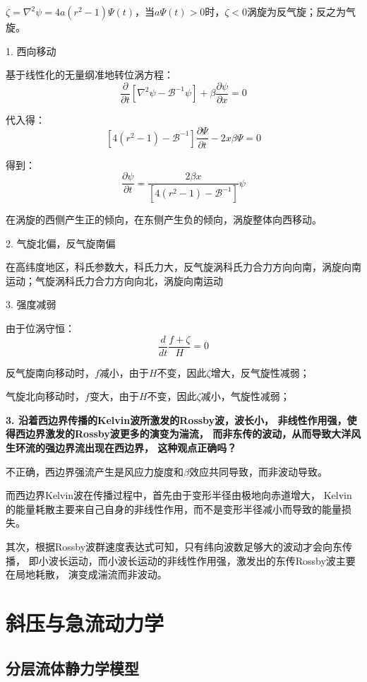 \documentclass{article}
\begin{document}
$\zeta={{\nabla }}^{2}{{\psi }} = 4a(r^2-1)\Psi(t)$，当$a\Psi(t)>0$时，$\zeta<0$涡旋为反气旋；反之为气旋。

1. 西向移动

基于线性化的无量纲准地转位涡方程：
$$\frac{\partial }{\partial {{t}}}\left[ {{\nabla }}^{2}{{\psi }}-{\mathcal{B}^{-1}}{{\psi }} \right]+{{\beta }}\frac{\partial {{\psi }}}{\partial {{x}}}=0$$

代入得：
$$\left[ 4({{r}^{2}}-1)-{{\mathcal{B}}^{-1}} \right]\frac{\partial \Psi }{\partial t}-2x\beta \Psi =0$$

得到：
$$\frac{\partial \psi }{\partial t}=\frac{2\beta x}{\left[ 4({{r}^{2}}-1)-{{\mathcal{B}}^{-1}} \right]}\psi$$

在涡旋的西侧产生正的倾向，在东侧产生负的倾向，涡旋整体向西移动。

2. 气旋北偏，反气旋南偏 

在高纬度地区，科氏参数大，科氏力大，反气旋涡科氏力合力方向向南，涡旋向南运动；气旋涡科氏力合力方向向北，涡旋向南运动

3. 强度减弱

由于位涡守恒：
$$\frac{d}{dt}\frac{f+\zeta}{H}=0$$

反气旋南向移动时，$f$减小，由于$H$不变，因此$\zeta$增大，反气旋性减弱；

气旋北向移动时，$f$变大，由于$H$不变，因此$\zeta$减小，气旋性减弱；

\textbf{3. 沿着西边界传播的Kelvin波所激发的Rossby波，波长小，
非线性作用强，使得西边界激发的Rossby波更多的演变为湍流，
而非东传的波动，从而导致大洋风生环流的强边界流出现在西边界，
这种观点正确吗？}

不正确，西边界强流产生是风应力旋度和$\beta$效应共同导致，而非波动导致。

而西边界Kelvin波在传播过程中，首先由于变形半径由极地向赤道增大，
Kelvin的能量耗散主要来自己自身的非线性作用，而不是变形半径减小而导致的能量损失。

其次，根据Rossby波群速度表达式可知，只有纬向波数足够大的波动才会向东传播，
即小波长运动，而小波长运动的非线性作用强，激发出的东传Rossby波主要在局地耗散，
演变成湍流而非波动。

\newpage

\section{斜压与急流动力学}
\subsection{分层流体静力学模型}
\end{document}

